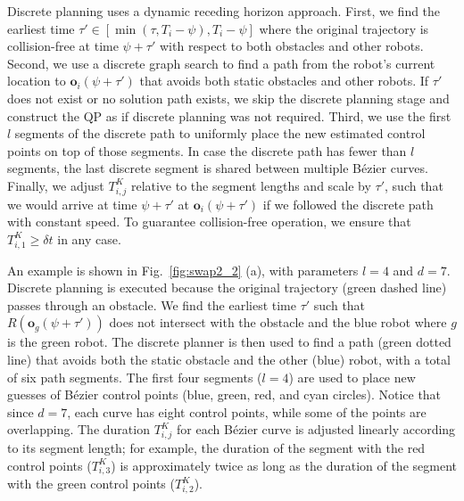 \documentclass{svproc}
\newcommand{\vo}{\mathbf{o}}
\begin{document}
Discrete planning uses a dynamic receding horizon approach. First, we find the earliest time $\tau'\in [\min(\tau, T_i-\psi), T_i-\psi]$ where the original trajectory is collision-free at time $\psi + \tau'$ with respect to both obstacles and other robots.
Second, we use a discrete graph search to find a path from the robot's current location to $\vo_i(\psi+\tau')$ that avoids both static obstacles and other robots.
If $\tau'$ does not exist or no solution path exists, we skip the discrete planning stage and construct the QP as if discrete planning was not required.
Third, we use the first $l$ segments of the discrete path to uniformly place the new estimated control points on top of those segments.
In case the discrete path has fewer than $l$ segments, the last discrete segment is shared between multiple B\'ezier curves.
Finally, we adjust $T_{i,j}^K$ relative to the segment lengths and scale by $\tau'$, such that we would arrive at time $\psi+\tau'$ at $\vo_i(\psi+\tau')$ if we followed the discrete path with constant speed.
To guarantee collision-free operation, we ensure that $T_{i,1}^K\geq \delta t$ in any case.

An example is shown in Fig.~\ref{fig:swap2_2} (a), with parameters $l=4$ and $d=7$.
Discrete planning is executed because the original trajectory (green dashed line) passes through an obstacle.
We find the earliest time $\tau'$ such that $R(\vo_g(\psi+\tau'))$ does not intersect with the obstacle and the blue robot where $g$ is the green robot. %
The discrete planner is then used to find a path  (green dotted line) that avoids both the static obstacle and the other (blue) robot, with a total of six path segments.
The first four segments ($l=4$) are used to place new guesses of B\'ezier control points (blue, green, red, and cyan circles).
Notice that since $d=7$, each curve has eight control points, while some of the points are overlapping.
The duration $T^{K}_{i,j}$ for each B\'ezier curve is adjusted linearly according to its segment length; for example, the duration of the segment with the red control points ($T_{i,3}^K$) is approximately twice as long as the duration of the segment with the green control points ($T_{i,2}^K$).
\end{document}
